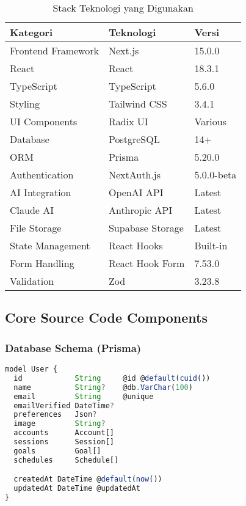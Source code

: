 \begin{table}[H]
\centering
\caption{Stack Teknologi yang Digunakan}
\begin{tabular}{|l|l|l|}
\hline
\textbf{Kategori} & \textbf{Teknologi} & \textbf{Versi} \\
\hline
Frontend Framework & Next.js & 15.0.0 \\
React & React & 18.3.1 \\
TypeScript & TypeScript & 5.6.0 \\
Styling & Tailwind CSS & 3.4.1 \\
UI Components & Radix UI & Various \\
Database & PostgreSQL & 14+ \\
ORM & Prisma & 5.20.0 \\
Authentication & NextAuth.js & 5.0.0-beta \\
AI Integration & OpenAI API & Latest \\
Claude AI & Anthropic API & Latest \\
File Storage & Supabase Storage & Latest \\
State Management & React Hooks & Built-in \\
Form Handling & React Hook Form & 7.53.0 \\
Validation & Zod & 3.23.8 \\
\hline
\end{tabular}
\end{table}

\subsection{Core Source Code Components}

\subsubsection{Database Schema (Prisma)}

\begin{lstlisting}[language=JavaScript, caption=prisma/schema.prisma - User Model]
model User {
  id            String     @id @default(cuid())
  name          String?    @db.VarChar(100)
  email         String     @unique
  emailVerified DateTime?
  preferences   Json?
  image         String?
  accounts      Account[]
  sessions      Session[]
  goals         Goal[]
  schedules     Schedule[]

  createdAt DateTime @default(now())
  updatedAt DateTime @updatedAt
}
\end{lstlisting}

